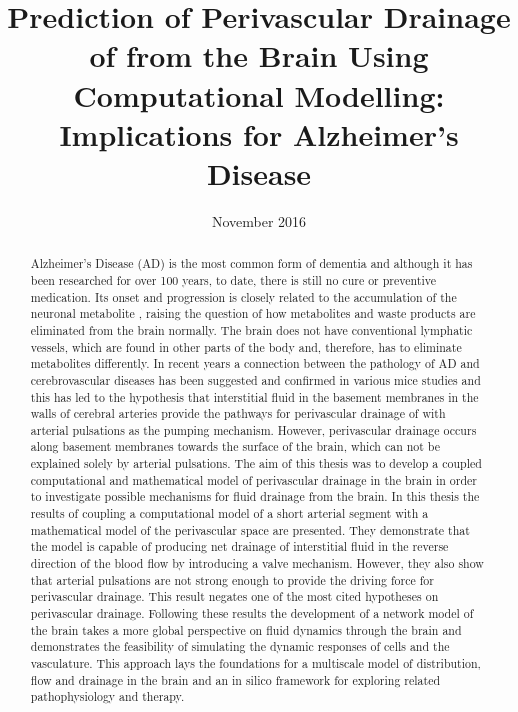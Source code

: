 \documentclass{ecsthesis}   %
\begin{document}
\frontmatter
\title      {Prediction of Perivascular Drainage of \Ab from the Brain Using Computational Modelling: Implications for Alzheimer's Disease}
\addresses  {\groupname\\\deptname\\\univname}
\date       {November 2016}
\subject    {}
\keywords   {}
\maketitle
\begin{abstract}
Alzheimer's Disease (AD) is the most common form of dementia and although it has been researched for over 100 years, to date, there is still no cure or preventive medication. Its onset and progression is closely related to the accumulation of the neuronal metabolite \Ab, raising the question of how metabolites and waste products are eliminated from the brain normally. The brain does not have conventional lymphatic vessels, which are found in other parts of the body and, therefore, has to eliminate metabolites differently. In recent years a connection between the pathology of AD and cerebrovascular diseases has been suggested and confirmed in various mice studies and this has led to the hypothesis that interstitial fluid in the basement membranes in the walls of cerebral arteries provide the pathways for perivascular drainage of \Ab with arterial pulsations as the pumping mechanism. However, perivascular drainage occurs along basement membranes towards the surface of the brain, which can not be explained solely by arterial pulsations. The aim of this thesis was to develop a coupled computational and mathematical model of perivascular drainage in the brain in order to investigate possible mechanisms for fluid drainage from the brain. In this thesis the results of coupling a computational model of a short arterial segment with a mathematical model of the perivascular space are presented. They demonstrate that the model is capable of producing net drainage of interstitial fluid in the reverse direction of the blood flow by introducing a valve mechanism. However, they also show that arterial pulsations are not strong enough to provide the driving force for perivascular drainage. This result negates one of the most cited hypotheses on perivascular drainage. Following these results the development of a network model of the brain takes a more global perspective on fluid dynamics through the brain and demonstrates the feasibility of simulating the dynamic responses of cells and the vasculature. This approach lays the foundations for a multiscale model of \Ab distribution, flow and drainage in the brain and an in silico framework for exploring related pathophysiology and therapy.
\end{abstract}
\end{document}
